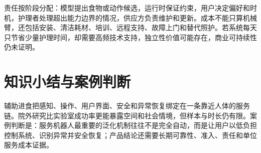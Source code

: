 责任按阶段分配：模型提出食物或动作候选，运行时保证约束，用户决定偏好和时机，护理者处理超出能力边界的情况，供应方负责维护和更新。成本不能只算机械臂，还包括安装、清洁耗材、培训、远程支持、故障上门和替代照护。若系统每天只节省少量护理时间，却需要高频技术支持，独立性价值可能存在，商业可持续性仍未证明。

\section{知识小结与案例判断}

辅助进食把感知、操作、用户界面、安全和异常恢复绑定在一条靠近人体的服务链。院外研究比实验室成功率更能暴露空间和社会情境，但样本与时长仍有限。案例判断是：服务机器人最重要的泛化机制往往不是完全自动，而是让用户以低负担控制系统、识别异常并安全恢复；产品结论还需要长期可靠性、准入、责任和单位服务成本证据。
